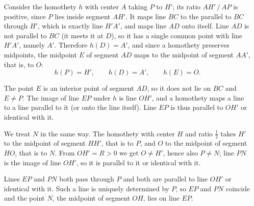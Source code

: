 {    Consider the homothety $h$ with center $A$ taking $P$ to $H'$; its ratio $AH' \, / \, AP$ is positive, since $P$ lies inside segment $AH'$. It maps line $BC$ to the parallel to $BC$ through $H'$, which is exactly line $H'A'$, and maps line $AD$ onto itself. Line $AD$ is not parallel to $BC$ (it meets it at $D$), so it has a single common point with line $H'A'$, namely $A'$. Therefore $h(D) = A'$, and since a homothety preserves midpoints, the midpoint $E$ of segment $AD$ maps to the midpoint of segment $AA'$, that is, to $O$:
    $$
    h(P) = H', \qquad h(D) = A', \qquad h(E) = O.
    $$

    The point $E$ is an interior point of segment $AD$, so it does not lie on $BC$ and $E \neq P$. The image of line $EP$ under $h$ is line $OH'$, and a homothety maps a line to a line parallel to it (or onto the line itself). Line $EP$ is thus parallel to $OH'$ or identical with it.

    We treat $N$ in the same way. The homothety with center $H$ and ratio $\frac12$ takes $H'$ to the midpoint of segment $HH'$, that is to $P$, and $O$ to the midpoint of segment $HO$, that is to $N$. From $OH' = R > 0$ we get $O \neq H'$, hence also $P \neq N$; line $PN$ is the image of line $OH'$, so it is parallel to it or identical with it.

    Lines $EP$ and $PN$ both pass through $P$ and both are parallel to line $OH'$ or identical with it. Such a line is uniquely determined by $P$, so $EP$ and $PN$ coincide and the point $N$, the midpoint of segment $OH$, lies on line $EP$.
}

